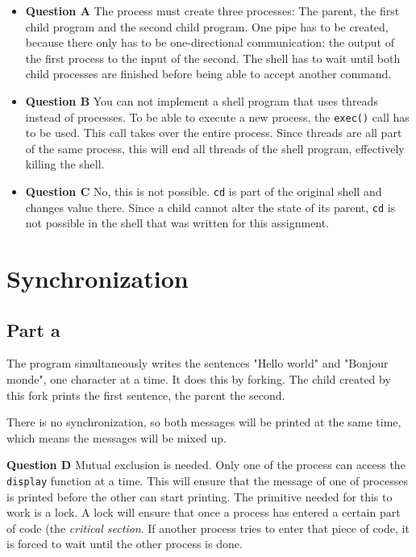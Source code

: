 \documentclass[a4paper]{article}
\begin{document}
\begin{itemize}
    \item \textbf{Question A} The process must create three processes: The parent, the 
            first child program and the second child program. One pipe has to be created,
            because there only has to be one-directional communication: the output of the
            first process to the input of the second. The shell has to wait until both
            child processes are finished before being able to accept another command.
    \item \textbf{Question B} You can not implement a shell program that uses threads
            instead of processes. To be able to execute a new process, the \texttt{exec()}
            call has to be used. This call takes over the entire process. Since threads
            are all part of the same process, this will end all threads of the shell 
            program, effectively killing the shell.
    \item \textbf{Question C} No, this is not possible. \texttt{cd} is part of the 
            original shell and changes value there. Since a child cannot alter the state
            of its parent, \texttt{cd} is not possible in the shell that was written for 
            this assignment.
\end{itemize}

\section{Synchronization}

\subsection{Part a}

The program simultaneously writes the sentences "Hello world" and "Bonjour monde", one
character at a time. It does this by forking. The child created by this fork prints the
first sentence, the parent the second.

There is no synchronization, so both messages will be printed at the same time, which
means the messages will be mixed up.

\textbf{Question D} Mutual exclusion is needed. Only one of the process can access the
\texttt{display} function at a time. This will ensure that the message of one of processes
is printed before the other can start printing. The primitive needed for this to work is a
lock. A lock will ensure that once a process has entered a certain part of code (the
\emph{critical section}. If another process tries to enter that piece of code, it is 
forced to wait until the other process is done.
\end{document}
